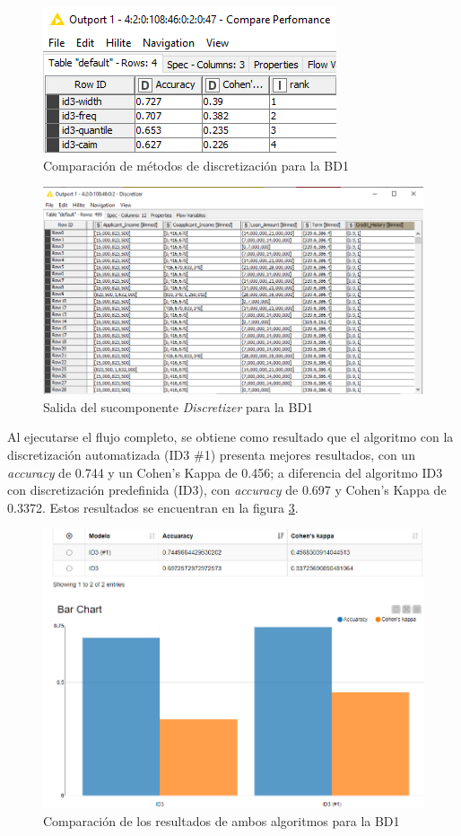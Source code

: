 \begin{figure}[H]
	\centering
	\includegraphics[width=0.5\linewidth]{"figuras/capi 3/pruebas-jenn/bd-loan_train-ranking"}
	\caption{Comparación de métodos de discretización para la BD1}
	\label{fig:bd-loantrain-ranking}
\end{figure}

\begin{figure}
	\centering
	\includegraphics[width=0.55\linewidth]{"figuras/capi 3/pruebas-jenn/bd-loan_train-salida-disc"}
	\caption{Salida del sucomponente \textit{Discretizer} para la BD1}
	\label{fig:bd-loantrain-salida-disc}
\end{figure}

Al ejecutarse el flujo completo, se obtiene como resultado que el algoritmo con la discretización automatizada (ID3 \#1) presenta mejores resultados, con un \textit{accuracy} de 0.744 y un Cohen's Kappa de 0.456; a diferencia del algoritmo ID3 con discretización predefinida (ID3), con \textit{accuracy} de 0.697 y Cohen's Kappa de 0.3372. Estos resultados se encuentran en la figura \ref{fig:bd-loantrain-result-barras}.

\begin{figure}[H]
	\centering
	\includegraphics[width=0.55\linewidth]{"figuras/capi 3/pruebas-jenn/bd-loan_train-result-barras"}
	\caption{Comparación de los resultados de ambos algoritmos para la BD1}
	\label{fig:bd-loantrain-result-barras}
\end{figure}

